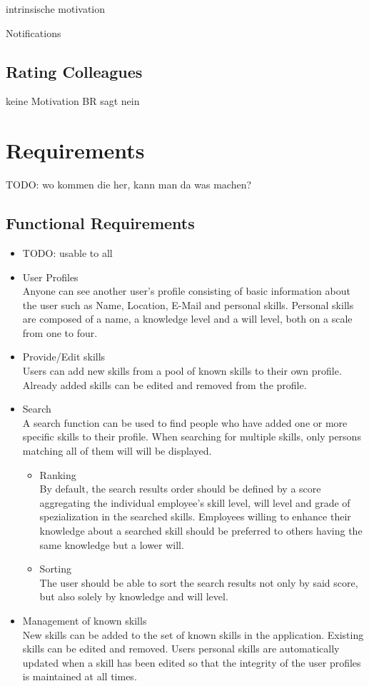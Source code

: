 intrinsische motivation

Notifications
\subsection{Rating Colleagues}
keine Motivation
BR sagt nein



\section{Requirements}
TODO: wo kommen die her, kann man da was machen?
\subsection{Functional Requirements}
\begin{itemize}
  \item TODO: usable to all
	\item User Profiles \\
	Anyone can see another user’s profile consisting of basic information about the user such as Name, Location, E-Mail and personal skills. Personal skills are composed of a name, a knowledge level and a will level, both on a scale from one to four.
	\item Provide/Edit skills\\
	Users can add new skills from a pool of known skills to their own profile. Already added skills can be edited and removed from the profile.
	\item Search\\
	A search function can be used to find people who have added one or more specific skills to their profile. When searching for multiple skills, only persons matching all of them will will be displayed.
	\begin{itemize}
		\item Ranking\\
			By default, the search results order should be defined by a score aggregating the individual employee's skill level, will level and grade of spezialization in the searched skills. Employees willing to enhance their knowledge about a searched skill should be preferred to others having the same knowledge but a lower will.
		\item Sorting\\
			The user should be able to sort the search results not only by said score,
			but also solely by knowledge and will level.
	\end{itemize}
	\item Management of known skills\\
	New skills can be added to the set of known skills in the application. Existing skills can be edited and removed. Users personal skills are automatically updated when a skill has been edited so that the integrity of the user profiles is maintained at all times.
\end{itemize}

